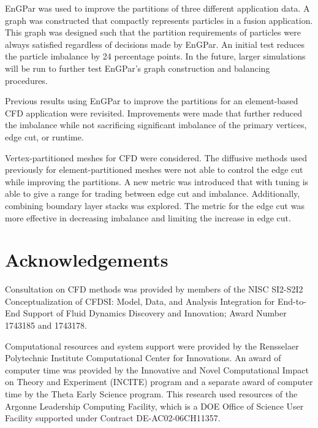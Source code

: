\documentclass[conference]{IEEEtran}
\begin{document}
EnGPar was used to improve the partitions of three different application data. A
graph was constructed that compactly represents particles in a fusion application. This
graph was designed such that the partition requirements of particles were always satisfied
regardless of decisions made by EnGPar.
An initial test reduces the particle imbalance by 24 percentage points.
In the future, larger simulations will
be run to further test EnGPar's graph construction and balancing procedures.

Previous results using EnGPar to improve the partitions for an element-based CFD application
were revisited. Improvements were made that further reduced the
imbalance while not sacrificing significant imbalance of the primary vertices,
edge cut, or runtime.

Vertex-partitioned meshes for CFD were considered. The diffusive methods used previously for
element-partitioned meshes were not able to control the edge cut while improving the partitions.
A new metric was introduced that with tuning is able to give a range for trading between edge
cut and imbalance. Additionally, combining boundary layer stacks was explored. The metric for
the edge cut was more effective in decreasing imbalance and limiting the increase in edge cut.

\section{Acknowledgements}

Consultation on CFD methods was provided by members of the NISC SI2-S2I2
Conceptualization of CFDSI: Model, Data, and Analysis Integration for End-to-End
Support of Fluid Dynamics Discovery and Innovation; Award Number 1743185 and 
1743178.

Computational resources and system support were provided by the Rensselaer
Polytechnic Institute Computational Center for Innovations.
An award of computer time was provided by the Innovative and Novel Computational
Impact on Theory and Experiment (INCITE) program and a separate award of
computer time by the Theta Early Science program.
This research used resources of the Argonne Leadership Computing Facility, which
is a DOE Office of Science User Facility supported under Contract
DE-AC02-06CH11357.





\end{document}
